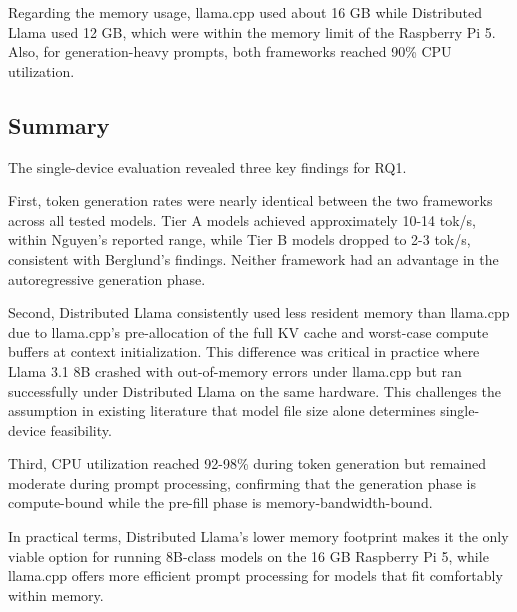 Regarding the memory usage, llama.cpp used about 16 GB while Distributed Llama used 12 GB, which were within the memory limit of the Raspberry Pi 5. Also, for generation-heavy prompts, both frameworks reached 90\% CPU utilization.

\subsection{Summary}
The single-device evaluation revealed three key findings for RQ1.

First, token generation rates were nearly identical between the two frameworks across all tested models. Tier A models achieved approximately 10-14 tok/s, within Nguyen's \cite{RN3} reported range, while Tier B models dropped to 2-3 tok/s, consistent with Berglund's \cite{RN12} findings. Neither framework had an advantage in the autoregressive generation phase.

Second, Distributed Llama consistently used less resident memory than llama.cpp due to llama.cpp's pre-allocation of the full KV cache and worst-case compute buffers at context initialization. This difference was critical in practice where Llama 3.1 8B crashed with out-of-memory errors under llama.cpp but ran successfully under Distributed Llama on the same hardware. This challenges the assumption in existing literature \cite{RN12, RN3} that model file size alone determines single-device feasibility.

Third, CPU utilization reached 92-98\% during token generation but remained moderate during prompt processing, confirming that the generation phase is compute-bound while the pre-fill phase is memory-bandwidth-bound.

In practical terms, Distributed Llama's lower memory footprint makes it the only viable option for running 8B-class models on the 16 GB Raspberry Pi 5, while llama.cpp offers more efficient prompt processing for models that fit comfortably within memory.

